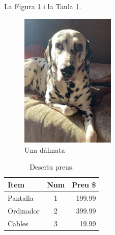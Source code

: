 \documentclass{article}
\begin{document}
La Figura \ref{fig:khal} i la Taula \ref{taula:items}.

\begin{figure}[h]
    \centering
    \includegraphics[width=0.4\textwidth]{khaleesi2}
    \caption{Una dàlmata}
    \label{fig:khal}
\end{figure}

\begin{table}[t]
    \centering
    \begin{tabular}{lcr}
        \toprule
        Item      & Num & Preu \$ \\
        \midrule
        Pantalla  & 1 & 199.99 \\
        Ordinador & 2 & 399.99 \\
        Cables    & 3 & 19.99 \\
        \bottomrule
    \end{tabular}
    \caption{Descriu preus.}
    \label{taula:items}
\end{table}
\end{document}
